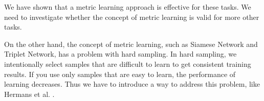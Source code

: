 \documentclass[twocolumn,10pt]{article}
\begin{document}
We have shown that a metric learning approach is effective for these tasks.
We need to investigate whether the concept of metric learning is valid for more other tasks.

On the other hand, the concept of metric learning, such as Siamese Network and Triplet Network, has a problem with hard sampling.
In hard sampling, we intentionally select samples that are difficult to learn to get consistent training results.
If you use only samples that are easy to learn, the performance of learning decreases.
Thus we have to introduce a way to address this problem, like Hermans et al. \cite{Hermans2017}.
\thispagestyle{empty}


\end{document}
